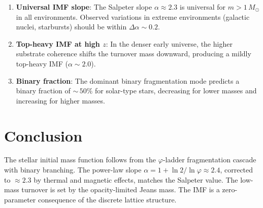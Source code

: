 \documentclass[12pt,a4paper]{article}
\theoremstyle{definition}
\theoremstyle{remark}
\begin{document}
\begin{enumerate}
  \item \textbf{Universal IMF slope}: The Salpeter slope
  $\alpha \approx 2.3$ is universal for $m > 1\,M_\odot$ in all
  environments.  Observed variations in extreme environments
  (galactic nuclei, starbursts) should be within $\Delta\alpha
  \sim 0.2$.

  \item \textbf{Top-heavy IMF at high $z$}: In the denser early
  universe, the higher substrate coherence shifts the turnover mass
  downward, producing a mildly top-heavy IMF ($\alpha \sim 2.0$).

  \item \textbf{Binary fraction}: The dominant binary fragmentation
  mode predicts a binary fraction of ${\sim}\,50\%$ for solar-type
  stars, decreasing for lower masses and increasing for higher
  masses.
\end{enumerate}

\section{Conclusion}
\label{sec:conclusion}

The stellar initial mass function follows from the $\varphi$-ladder
fragmentation cascade with binary branching.  The power-law slope
$\alpha = 1 + \ln 2/\ln\varphi \approx 2.4$, corrected to
$\approx 2.3$ by thermal and magnetic effects, matches the Salpeter
value.  The low-mass turnover is set by the opacity-limited Jeans
mass.  The IMF is a zero-parameter consequence of the discrete
lattice structure.
\end{document}
